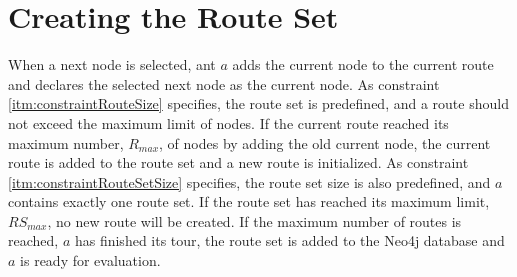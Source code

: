 \section{Creating the Route Set}
\label{sec:algoCreatingRouteSet}

When a next node is selected, ant $a$ adds the current node to the current route and declares the selected next node as the current node. As constraint \vref{itm:constraintRouteSize} specifies, the route set is predefined, and a route should not exceed the maximum limit of nodes. If the current route reached its maximum number, $R_{max}$, of nodes by adding the old current node, the current route is added to the route set and a new route is initialized. As constraint \vref{itm:constraintRouteSetSize} specifies, the route set size is also predefined, and $a$ contains exactly one route set. If the route set has reached its maximum limit, $RS_{max}$, no new route will be created. If the maximum number of routes is reached, $a$ has finished its tour, the route set is added to the Neo4j database and $a$ is ready for evaluation. 